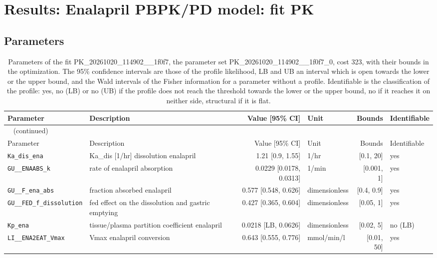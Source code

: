 \section{Results: Enalapril PBPK/PD model: fit PK}

\subsection{Parameters}

\begin{longtable}{llrlrl}
\caption{Parameters of the fit PK\_20261020\_114902\_\_1f0f7, the parameter set PK\_20261020\_114902\_\_1f0f7\_0, cost 323, with their bounds in the optimization. The 95\% confidence intervals are those of the profile likelihood, LB and UB an interval which is open towards the lower or the upper bound, and the Wald intervals of the Fisher information for a parameter without a profile. Identifiable is the classification of the profile: yes, no (LB) or no (UB) if the profile does not reach the threshold towards the lower or the upper bound, no if it reaches it on neither side, structural if it is flat.}\label{tab:parameters:PK_20261020_114902__1f0f7} \\
\toprule
Parameter & Description & Value [95\% CI] & Unit & Bounds & Identifiable \\
\midrule
\endfirsthead
\multicolumn{6}{l}{\small\tablename~\thetable{} (continued)} \\
\toprule
Parameter & Description & Value [95\% CI] & Unit & Bounds & Identifiable \\
\midrule
\endhead
\bottomrule
\endlastfoot
\texttt{Ka\_dis\_ena} & Ka\_dis [1/hr] dissolution enalapril & 1.21 [0.9, 1.55] & 1/hr & [0.1, 20] & yes \\
\texttt{GU\_\_ENAABS\_k} & rate of enalapril absorption & 0.0229 [0.0178, 0.0313] & 1/min & [0.001, 1] & yes \\
\texttt{GU\_\_F\_ena\_abs} & fraction absorbed enalapril & 0.577 [0.548, 0.626] & dimensionless & [0.4, 0.9] & yes \\
\texttt{GU\_\_FED\_f\_dissolution} & fed effect on the dissolution and gastric emptying & 0.427 [0.365, 0.604] & dimensionless & [0.05, 1] & yes \\
\texttt{Kp\_ena} & tissue/plasma partition coefficient enalapril & 0.0218 [LB, 0.0626] & dimensionless & [0.02, 5] & no (LB) \\
\texttt{LI\_\_ENA2EAT\_Vmax} & Vmax enalapril conversion & 0.643 [0.555, 0.776] & mmol/min/l & [0.01, 50] & yes \\

\end{longtable}
